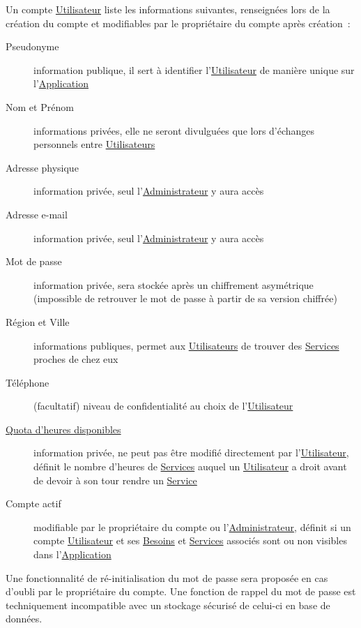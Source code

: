 \documentclass[french,12pt]{article}
\begin{document}
			Un compte \hyperlink{utilisateur}{Utilisateur} liste les informations
			 suivantes, renseignées lors de la création du compte et modifiables par
			 le propriétaire du compte après création :
			\begin{description}
				\item [Pseudonyme]
					information publique, il sert à identifier
					 l’\hyperlink{utilisateur}{Utilisateur} de manière unique sur
					 l’\hyperlink{application}{Application}
				\item [Nom et Prénom]
					informations privées, elle ne seront divulguées que lors d’échanges
					 personnels entre \hyperlink{utilisateur}{Utilisateurs}
				\item [Adresse physique]
					information privée, seul l’\hyperlink{administrateur}{Administrateur}
					 y aura accès
				\item [Adresse e-mail]
					information privée, seul l’\hyperlink{administrateur}{Administrateur}
					 y aura accès
				\item [Mot de passe]
					information privée, sera stockée après un chiffrement asymétrique
					 (impossible de retrouver le mot de passe à partir de sa version
					 chiffrée)
				\item [Région et Ville]
					informations publiques, permet aux
					 \hyperlink{utilisateur}{Utilisateurs} de trouver des
					 \hyperlink{service}{Services} proches de chez eux
				\item [Téléphone]
					(facultatif) niveau de confidentialité au choix de
					 l’\hyperlink{utilisateur}{Utilisateur}
				\item [\hyperlink{quota}{Quota d’heures disponibles}]
					information privée, ne peut pas être modifié directement par
					 l’\hyperlink{utilisateur}{Utilisateur}, définit le nombre d’heures de
					 \hyperlink{service}{Services} auquel un
					 \hyperlink{utilisateur}{Utilisateur} a droit avant de devoir à son
					 tour rendre un \hyperlink{service}{Service}
				\item [Compte actif]
					modifiable par le propriétaire du compte ou
					 l’\hyperlink{administrateur}{Administrateur}, définit si un compte
					 \hyperlink{utilisateur}{Utilisateur} et ses
					 \hyperlink{besoin}{Besoins} et \hyperlink{service}{Services} associés
					 sont ou non visibles dans l’\hyperlink{application}{Application}
			\end{description}

			Une fonctionnalité de ré-initialisation du mot de passe sera proposée en
			 cas d’oubli par le propriétaire du compte. Une fonction de rappel du mot
			 de passe est techniquement incompatible avec un stockage sécurisé de
			 celui-ci en base de données.
\end{document}
